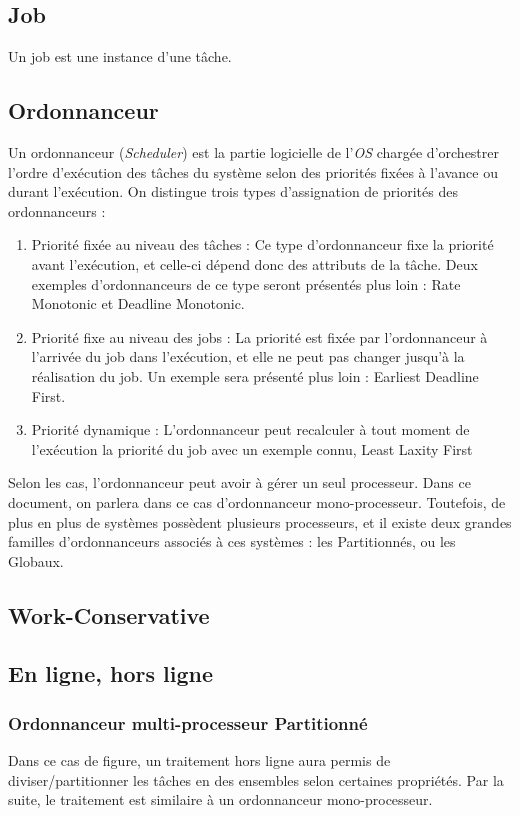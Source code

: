 \documentclass[11pt,a4paper,oneside]{report}
\begin{document}
\subsection{Job}
Un job est une instance d'une tâche. %

\subsection{Ordonnanceur}
Un ordonnanceur (\textit{Scheduler}) est la partie logicielle de 
l'\textit{OS} chargée d'orchestrer l'ordre d'exécution des tâches du système 
selon des priorités fixées à l'avance ou durant l'exécution. 
On distingue trois types d'assignation de priorités des ordonnanceurs : \\
\begin{enumerate}
	\item Priorité fixée au niveau des tâches : Ce type d'ordonnanceur fixe la priorité 
	avant l'exécution, et celle-ci dépend donc des attributs de la tâche. 
	Deux exemples d'ordonnanceurs de ce type seront présentés plus loin : Rate Monotonic et 
	Deadline Monotonic.
	\item Priorité fixe au niveau des jobs : La priorité est fixée par l'ordonnanceur à l'arrivée du job 
	dans l'exécution, et elle ne peut pas changer jusqu'à la réalisation du job. Un exemple sera présenté plus loin : Earliest Deadline First.
	\item Priorité dynamique : L'ordonnanceur peut recalculer à tout moment de l'exécution 
	la priorité du job avec un exemple connu, Least Laxity First %
\end{enumerate}
	
Selon les cas, l'ordonnanceur peut avoir à gérer un seul processeur. Dans ce 
document, on parlera dans ce cas d'ordonnanceur mono-processeur. Toutefois, de plus en 
plus de systèmes possèdent plusieurs processeurs, et il existe deux grandes familles 
d'ordonnanceurs associés à ces systèmes : les Partitionnés, ou les Globaux. \\

\subsection{Work-Conservative}
\subsection{En ligne, hors ligne}

\subsubsection{Ordonnanceur multi-processeur Partitionné}
Dans ce cas de figure, un traitement hors ligne aura permis de diviser/partitionner 
les tâches en des ensembles selon certaines propriétés. Par la suite, le traitement 
est similaire à un ordonnanceur mono-processeur.
\end{document}
